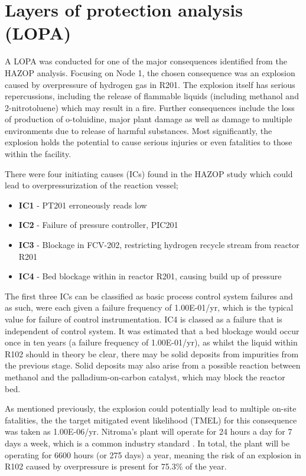 \section{Layers of protection analysis (LOPA)}

A LOPA was conducted for one of the major consequences identified from the HAZOP analysis. Focusing on Node 1, the chosen consequence was an explosion caused by overpressure of hydrogen gas in R201. The explosion itself has serious repercussions, including the release of flammable liquids (including methanol and 2-nitrotoluene) which may result in a fire. Further consequences include the loss of production of o-toluidine, major plant damage as well as damage to multiple environments due to release of harmful substances. Most significantly, the explosion holds the potential to cause serious injuries or even fatalities to those within the facility. 

There were four initiating causes (ICs) found in the HAZOP study which could lead to overpressurization of the reaction vessel;

\begin{itemize}
\item \textbf{IC1} - PT201 erroneously reads low 
\item \textbf{IC2} - Failure of pressure controller, PIC201 
\item \textbf{IC3 }- Blockage in FCV-202, restricting hydrogen recycle stream from reactor R201 
\item \textbf{IC4} - Bed blockage within in reactor R201, causing build up of pressure 
\end{itemize}

The first three ICs can be classified as basic process control system failures and as such, were each given a failure frequency of 1.00E-01/yr, which is the typical value for failure of control instrumentation. IC4 is classed as a failure that is independent of control system. It was estimated that a bed blockage would occur once in ten years (a failure frequency of 1.00E-01/yr), as whilst the liquid within R102 should in theory be clear, there may be solid deposits from impurities from the previous stage. Solid deposits may also arise from a possible reaction between methanol and the palladium-on-carbon catalyst, which may block the reactor bed. 


As mentioned previously, the explosion could potentially lead to multiple on-site fatalities, the the target mitigated event likelihood (TMEL) for this consequence was taken as 1.00E-06/yr. Nitroma's plant will operate for 24 hours a day for 7 days a week, which is a common industry standard \cite{job_guide_chemical_2021}. In total, the plant will be operating for 6600 hours (or 275 days) a year, meaning the risk of an explosion in R102 caused by overpressure is present for 75.3\% of the year.  
 
